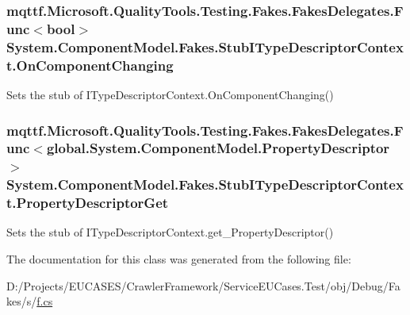 \hypertarget{class_system_1_1_component_model_1_1_fakes_1_1_stub_i_type_descriptor_context_af50d7a94ea1e9a0b94f4c51a783231e3}{
\subsubsection[{On\-Component\-Changing}]{\setlength{\rightskip}{0pt plus 5cm}mqttf.\-Microsoft.\-Quality\-Tools.\-Testing.\-Fakes.\-Fakes\-Delegates.\-Func$<$bool$>$ System.\-Component\-Model.\-Fakes.\-Stub\-I\-Type\-Descriptor\-Context.\-On\-Component\-Changing}}\label{class_system_1_1_component_model_1_1_fakes_1_1_stub_i_type_descriptor_context_af50d7a94ea1e9a0b94f4c51a783231e3}


Sets the stub of I\-Type\-Descriptor\-Context.\-On\-Component\-Changing()

\hypertarget{class_system_1_1_component_model_1_1_fakes_1_1_stub_i_type_descriptor_context_ae3fbd51de693e5e2628ee16543e7168a}{
\subsubsection[{Property\-Descriptor\-Get}]{\setlength{\rightskip}{0pt plus 5cm}mqttf.\-Microsoft.\-Quality\-Tools.\-Testing.\-Fakes.\-Fakes\-Delegates.\-Func$<$global.\-System.\-Component\-Model.\-Property\-Descriptor$>$ System.\-Component\-Model.\-Fakes.\-Stub\-I\-Type\-Descriptor\-Context.\-Property\-Descriptor\-Get}}\label{class_system_1_1_component_model_1_1_fakes_1_1_stub_i_type_descriptor_context_ae3fbd51de693e5e2628ee16543e7168a}


Sets the stub of I\-Type\-Descriptor\-Context.\-get\-\_\-\-Property\-Descriptor()



The documentation for this class was generated from the following file\-:\begin{DoxyCompactItemize}
\item 
D\-:/\-Projects/\-E\-U\-C\-A\-S\-E\-S/\-Crawler\-Framework/\-Service\-E\-U\-Cases.\-Test/obj/\-Debug/\-Fakes/s/\hyperlink{s_2f_8cs}{f.\-cs}\end{DoxyCompactItemize}
